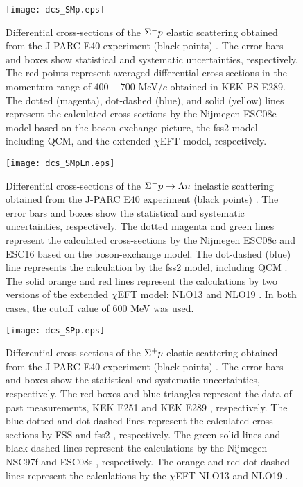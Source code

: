 \begin{figure}[!h]
  \begin{center}
   \texttt{[image: dcs\_SMp.eps]}
   \caption{Differential cross-sections of the $\Sigma^{-}p$ elastic scattering obtained from the J-PARC E40 experiment (black points) \cite{Miwa-SMp}. The error bars and boxes show statistical and systematic uncertainties, respectively. The red points represent averaged differential cross-sections in the momentum range of $400-700$ MeV/$c$ obtained in KEK-PS E289. The dotted (magenta), dot-dashed (blue), and solid (yellow) lines represent the calculated cross-sections by the Nijmegen ESC08c model based on the boson-exchange picture, the fss2 model including QCM, and the extended $\chi$EFT model, respectively.}
   \label{fig-dcs_SMp}
 \end{center}
\end{figure}

\begin{figure}[!h]
  \begin{center}
   \texttt{[image: dcs\_SMpLn.eps]}
   \caption{Differential cross-sections of the $\Sigma^- p \to \Lambda n$ inelastic scattering obtained from the J-PARC E40 experiment (black points) \cite{Miwa-SMLn}. The error bars and boxes show the statistical and systematic uncertainties, respectively. The dotted magenta and green lines represent the calculated cross-sections by the Nijmegen ESC08c \cite{OBP2} and ESC16 \cite{ESC16} based on the boson-exchange model. The dot-dashed (blue) line represents the calculation by the fss2 model, including QCM \cite{Fujiwara-2007}. The solid orange and red lines represent the calculations by two versions of the extended $\chi$EFT model: NLO13 \cite{NLO13} and NLO19 \cite{chiEFT-2020}. In both cases, the cutoff value of 600 MeV was used.}
   \label{fig-dcs_SMpLn}
 \end{center}
\end{figure}

\begin{figure}[!h]
  \begin{center}
   \texttt{[image: dcs\_SPp.eps]}
   \caption{Differential cross-sections of the $\Sigma^{+}p$ elastic scattering obtained from the J-PARC E40 experiment (black points) \cite{Nana-SPp}. The error bars and boxes show the statistical and systematic uncertainties, respectively. The red boxes and blue triangles represent the data of past measurements, KEK E251 \cite{KEK1} and KEK E289 \cite{KEK3}, respectively. The blue dotted and dot-dashed lines represent the calculated cross-sections by FSS and fss2 \cite{Fujiwara-2007}, respectively. The green solid lines and black dashed lines represent the calculations by the Nijmegen NSC97f \cite{OBE-1999} and ESC08s \cite{OBP2}, respectively. The orange and red dot-dashed lines represent the calculations by the $\chi$EFT NLO13 \cite{NLO13} and NLO19 \cite{chiEFT-2020}.}
   \label{fig-dcs_SPp}
 \end{center}
\end{figure}

